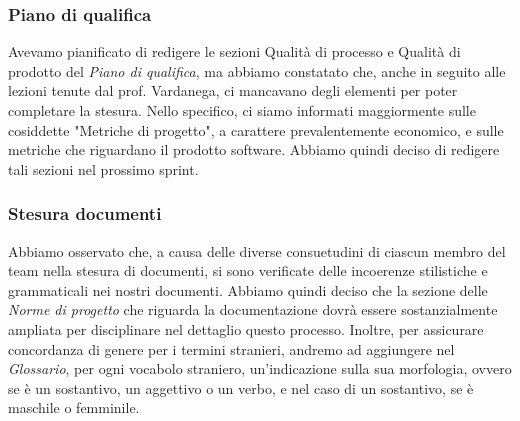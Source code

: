         \subsubsection{Piano di qualifica}
            Avevamo pianificato di redigere le sezioni Qualità di processo e Qualità di prodotto 
            del \textit{Piano di qualifica}, ma abbiamo constatato che, anche in seguito alle
            lezioni tenute dal prof. Vardanega, ci mancavano degli elementi per poter completare
            la stesura. Nello specifico, ci siamo informati maggiormente sulle cosiddette
            "Metriche di progetto", a carattere prevalentemente economico, e sulle metriche
            che riguardano il prodotto software.
            Abbiamo quindi deciso di redigere tali sezioni nel prossimo sprint.
        \subsubsection{Stesura documenti}
            Abbiamo osservato che, a causa delle diverse consuetudini di ciascun membro del team 
            nella stesura di documenti, si sono verificate delle incoerenze stilistiche e grammaticali nei nostri
            documenti. Abbiamo quindi deciso che la sezione delle \textit{Norme di progetto} che 
            riguarda la documentazione dovrà essere sostanzialmente ampliata per disciplinare 
            nel dettaglio questo processo. Inoltre, per assicurare concordanza di genere per i 
            termini stranieri, andremo ad aggiungere nel \textit{Glossario}, per ogni vocabolo
            straniero, un'indicazione sulla sua morfologia, ovvero se è un sostantivo,
            un aggettivo o un verbo, e nel caso di un sostantivo, se è maschile o femminile.
            
